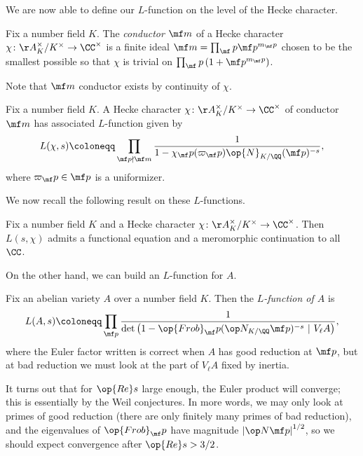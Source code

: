 \documentclass[../notes.tex]{subfiles}
\begin{document}
We are now able to define our $L$-function on the level of the Hecke character.
\begin{definition}[conductor]
	Fix a number field $K$. The \textit{conductor} $\mf m$ of a Hecke character $\chi\colon\AA_K^\times/K^\times\to\CC^\times$ is a finite ideal $\mf m=\prod_\mf p\mf p^{m_\mf p}$ chosen to be the smallest possible so that $\chi$ is trivial on $\prod_\mf p\left(1+\mf p^{m_\mf p}\right)$.
\end{definition}
Note that $\mf m$ conductor exists by continuity of $\chi$.
\begin{definition}
	Fix a number field $K$. A Hecke character $\chi\colon\AA_K^\times/K^\times\to\CC^\times$ of conductor $\mf m$ has associated $L$-function given by
	\[L(\chi,s)\coloneqq\prod_{\mf p\nmid\mf m}\frac1{1-\chi_\mf p(\varpi_\mf p)\op{N}_{K/\QQ}(\mf p)^{-s}},\]
	where $\varpi_\mf p\in\mf p$ is a uniformizer.
\end{definition}
We now recall the following result on these $L$-functions.
\begin{theorem}
	Fix a number field $K$ and a Hecke character $\chi\colon\AA_K^\times/K^\times\to\CC^\times$. Then $L(s,\chi)$ admits a functional equation and a meromorphic continuation to all $\CC$.
\end{theorem}
On the other hand, we can build an $L$-function for $A$.
\begin{definition}
	Fix an abelian variety $A$ over a number field $K$. Then the \textit{$L$-function of $A$} is
	\[L(A,s)\coloneqq\prod_{\mf p}\frac1{\det\left(1-\op{Frob}_\mf p(\op N_{K/\QQ}\mf p)^{-s}~|~V_\ell A\right)},\]
	where the Euler factor written is correct when $A$ has good reduction at $\mf p$, but at bad reduction we must look at the part of $V_\ell A$ fixed by inertia.
\end{definition}
It turns out that for $\op{Re}s$ large enough, the Euler product will converge; this is essentially by the Weil conjectures. In more words, we may only look at primes of good reduction (there are only finitely many primes of bad reduction), and the eigenvalues of $\op{Frob}_\mf p$ have magnitude $\left|\op N\mf p\right|^{1/2}$, so we should expect convergence after $\op{Re}s>3/2$.
\end{document}
